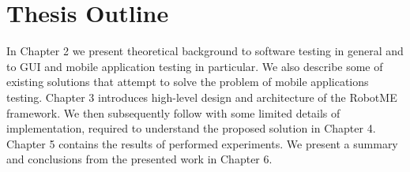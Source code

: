 \section{Thesis Outline}

In Chapter 2 we present theoretical background to software testing in general and
to GUI and mobile application testing in particular. We also describe some of existing
solutions that attempt to solve the problem of mobile applications testing. Chapter 3 introduces
high-level design and architecture of the RobotME framework. We then subsequently follow with some 
limited details of implementation, required to understand the proposed solution in Chapter 4.
Chapter 5 contains the results of performed experiments. We present a summary and conclusions from
the presented work in Chapter 6.
